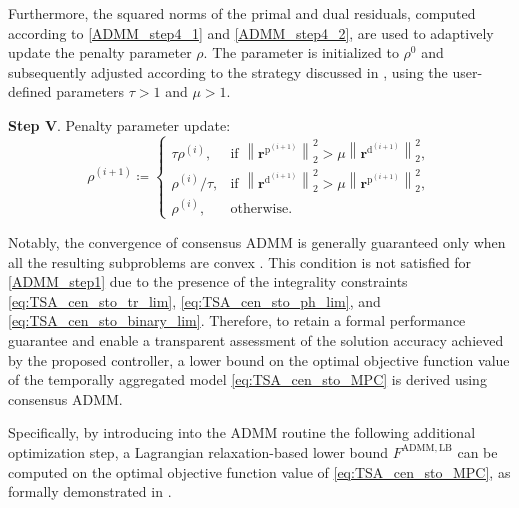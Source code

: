 \documentclass[a4paper,fleqn]{cas-sc}
\begin{document}
Furthermore, the squared norms of the primal and dual residuals, computed according to \eqref{ADMM_step4_1} and \eqref{ADMM_step4_2},
are used to adaptively update the penalty parameter $\rho$. 
The parameter is initialized to $\rho^{0}$ and subsequently adjusted according to the strategy discussed in \cite{boyd2010distributed}, using the user-defined parameters $\tau > 1$ and $\mu > 1$.

\textbf{Step V}. Penalty parameter update:
\begin{equation}
\rho^{(i+1)} \coloneqq
\begin{cases}
\tau \rho^{(i)},
& \text{if } \left\|\boldsymbol{r}^{\boldsymbol{\mathrm{p}}^{(i+1)}}\right\|_2^2 > \mu \left\|\boldsymbol{r}^{\boldsymbol{\mathrm{d}}^{(i+1)}}\right\|_2^2,\\[0.4em]
\rho^{(i)} / \tau,
& \text{if } \left\|\boldsymbol{r}^{\boldsymbol{\mathrm{d}}^{(i+1)}}\right\|_2^2 > \mu \left\|\boldsymbol{r}^{\boldsymbol{\mathrm{p}}^{(i+1)}}\right\|_2^2,\\[0.4em]
\rho^{(i)},
& \text{otherwise}.
\end{cases}
\label{ADMM_step5}
\end{equation}

Notably, the convergence of consensus ADMM is generally guaranteed only when all the resulting subproblems are convex \citep{molzahn2017survey}. 
This condition is not satisfied for \eqref{ADMM_step1} due to the presence of the integrality constraints \eqref{eq:TSA_cen_sto_tr_lim}, \eqref{eq:TSA_cen_sto_ph_lim}, and \eqref{eq:TSA_cen_sto_binary_lim}. 
Therefore, to retain a formal performance guarantee and enable a transparent assessment of the solution accuracy achieved by the proposed controller, 
a lower bound on the optimal objective function value of the temporally aggregated model \eqref{eq:TSA_cen_sto_MPC} is derived using consensus ADMM.

Specifically, by introducing into the ADMM routine the following additional optimization step, a Lagrangian relaxation-based lower bound $F^{\mathrm{ADMM,LB}}$ can be computed on the optimal objective function value of \eqref{eq:TSA_cen_sto_MPC}, as formally demonstrated in \cite{gade2016obtaining}.
\end{document}
